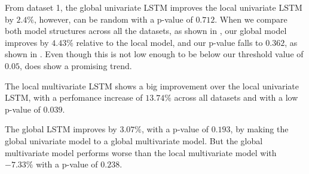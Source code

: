 From dataset 1, the global univariate LSTM improves the local univariate
LSTM by $2.4\%$, however, can be random with a p-value of $0.712$.
When we compare both model structures across all the datasets,
as shown in ,
our global model improves by $4.43\%$ relative to the local model,
and our p-value falls to $0.362$, as shown in .
Even though this is not low enough
to be below our threshold value of $0.05$, does show a promising trend.


The local multivariate LSTM shows a big improvement over the local univariate LSTM,
with a perfomance increase of $13.74\%$ across all datasets and with a
low p-value of $0.039$.

The global LSTM improves by $3.07\%$, with a p-value of $0.193$, by making the global univariate model to a global multivariate model.
But the global multivariate model performs worse than the local multivariate model with $-7.33\%$ with a p-value of $0.238$.


%
%
%
%
%
%
%
%
%